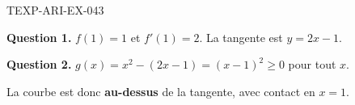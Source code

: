 \begin{corrige}{TEXP-ARI-EX-043}

\textbf{Question 1.} $f(1) = 1$ et $f'(1) = 2$. La tangente est $y = 2x - 1$.


\textbf{Question 2.} $g(x) = x^2 - (2x-1) = (x-1)^2 \geq 0$ pour tout $x$.

La courbe est donc \textbf{au-dessus} de la tangente, avec contact en $x = 1$.

\end{corrige}
